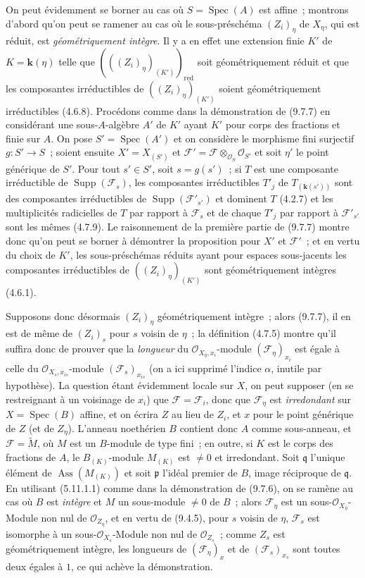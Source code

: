 On peut évidemment se borner au cas où $S=\operatorname{Spec}(A)$ est affine~;
montrons d'abord qu'on peut se ramener au cas où le sous-préschéma $(Z_i)_\eta$
de $X_\eta$, qui est réduit, est \emph{géométriquement intègre}. Il y a en effet
une extension finie $K'$ de $K=\boldsymbol{k}(\eta)$ telle que
$(((Z_i)_\eta)_{(K')})_{\mathrm{red}}$ soit géométriquement réduit et que les
composantes irréductibles de $((Z_i)_\eta)_{(K')}$ soient géométriquement
irréductibles (4.6.8). Procédons comme dans la démonstration de (9.7.7) en
considérant une sous-$A$-algèbre $A'$ de $K'$ ayant $K'$ pour corps des
fractions et finie sur $A$. On pose $S'=\operatorname{Spec}(A')$ et on considère
le morphisme fini surjectif $g:S'\to S$~; soient ensuite $X'=X_{(S')}$ et
$\mathcal F'=\mathcal F\otimes_{\mathcal O_S}\mathcal O_{S'}$ et soit $\eta'$
le point générique de $S'$. Pour tout $s'\in S'$, soit $s=g(s')$~; si $T$ est
une composante irréductible de $\operatorname{Supp}(\mathcal F_s)$, les
composantes irréductibles $T'_j$ de $T_{(\mathbf{k}(s'))}$ sont des
composantes irréductibles de $\operatorname{Supp}(\mathcal F'_{s'})$ et dominent
$T$ (4.2.7) et les multiplicités radicielles de $T$ par rapport à $\mathcal F_s$
et de chaque $T'_j$ par rapport à $\mathcal F'_{s'}$ sont les mêmes (4.7.9). Le
raisonnement de la première partie de (9.7.7) montre donc qu'on peut se borner à
démontrer la proposition pour $X'$ et $\mathcal F'$~; et en vertu du choix de
$K'$, les sous-préschémas réduits ayant pour espaces sous-jacents les composantes
irréductibles de $((Z_i)_\eta)_{(K')}$ sont géométriquement intègres (4.6.1).

Supposons donc désormais $(Z_i)_\eta$ géométriquement intègre~; alors (9.7.7),
il en est de même de $(Z_i)_s$ pour $s$ voisin de $\eta$~; la définition (4.7.5)
montre qu'il suffira donc de prouver que la \emph{longueur} du
$\mathcal O_{X_\eta,x_i}$-module $(\mathcal F_\eta)_{x_i}$ est égale à celle du
$\mathcal O_{X_s,x_{is}}$-module $(\mathcal F_s)_{x_{is}}$ (on a ici supprimé
l'indice $\alpha$, inutile par hypothèse). La question étant évidemment locale
sur $X$, on peut supposer (en se restreignant à un voisinage de $x_i$) que
$\mathcal F=\mathcal F_i$, donc que $\mathcal F_\eta$ est \emph{irredondant} sur
$X=\operatorname{Spec}(B)$ affine, et on écrira $Z$ au lieu de $Z_i$, et $x$
pour le point générique de $Z$ (et de $Z_\eta$). L'anneau noethérien $B$
contient donc $A$ comme sous-anneau, et $\mathcal F=\widetilde M$, où $M$ est un
$B$-module de type fini~; en outre, si $K$ est le corps des fractions de $A$,
le $B_{(K)}$-module $M_{(K)}$ est $\neq0$ et irredondant. Soit $\mathfrak q$ l'unique
élément de $\operatorname{Ass}(M_{(K)})$ et soit $\mathfrak p$ l'idéal premier
de $B$, image réciproque de $\mathfrak q$. En utilisant (5.11.1.1) comme dans la
démonstration de (9.7.6), on se ramène au cas où $B$ est \emph{intègre} et $M$
un sous-module $\neq0$ de $B$~; alors $\mathcal F_\eta$ est un
sous-$\mathcal O_{X_\eta}$-Module non nul de $\mathcal O_{Z_\eta}$, et en vertu
de (9.4.5), pour $s$ voisin de $\eta$, $\mathcal F_s$ est isomorphe à un
sous-$\mathcal O_{X_s}$-Module non nul de $\mathcal O_{Z_s}$~; comme $Z_s$ est
géométriquement intègre, les longueurs de $(\mathcal F_\eta)_x$ et de
$(\mathcal F_s)_{x_s}$ sont toutes deux égales à $1$, ce qui achève la
démonstration.

